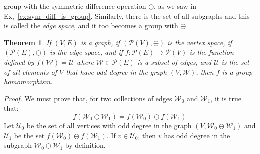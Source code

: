 \documentclass{article}
\theoremstyle{plain}
\newtheorem{theorem}{Theorem}[section]
\theoremstyle{normal}
\begin{document}
            group with the symmetric difference operation $\ominus$, as we saw
            in Ex,~\ref{ex:sym_diff_is_group}. Similarly, there is the set of
            all subgraphs and this is called the \textit{edge space}, and it
            too becomes a group with $\ominus$
            \begin{theorem}
                If $(V,E)$ is a graph, if $(\mathcal{P}(V),\ominus)$ is the
                vertex space, if $(\mathcal{P}(E),\ominus)$ is the edge space,
                and if $f:\mathcal{P}(E)\rightarrow\mathcal{P}(V)$ is the
                function defined by $f(\mathcal{W})=\mathcal{U}$ where
                $\mathcal{W}\in\mathcal{P}(E)$ is a subset of edges, and
                $\mathcal{U}$ is the set of all elements of $V$ that have
                odd degree in the graph $(V,\mathcal{W})$, then $f$ is a
                group homomorphism.
            \end{theorem}
            \begin{proof}
                We must prove that, for two collections of edges
                $\mathcal{W}_{0}$ and $\mathcal{W}_{1}$, it is true that:
                \begin{equation}
                    f(\mathcal{W}_{0}\ominus\mathcal{W}_{1})
                    =f(\mathcal{W}_{0})\ominus{f}(\mathcal{W}_{1})
                \end{equation}
                Let $\mathcal{U}_{0}$ be the set of all vertices with odd
                degree in the graph $(V,\mathcal{W}_{0}\ominus\mathcal{W}_{1})$
                and $\mathcal{U}_{1}$ be the set
                $f(\mathcal{W}_{0})\ominus{f}(\mathcal{W}_{1})$. If
                $v\in\mathcal{U}_{0}$, then $v$ has odd degree in the subgraph
                $\mathcal{W}_{0}\ominus\mathcal{W}_{1}$ by definition.
            \end{proof}
\end{document}

